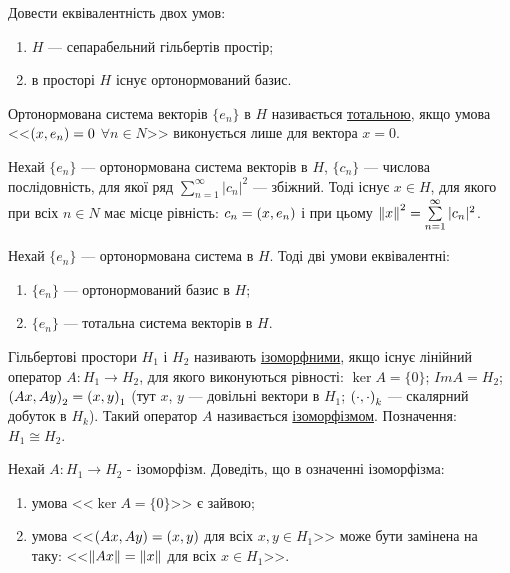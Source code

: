 \begin{exercise}
    Довести еквівалентність двох умов:
    \begin{enumerate}[label=\ukr*)]
        \item $H$ --- сепарабельний гільбертів простір;
        \item в просторі $H$ існує ортонормований базис.
    \end{enumerate}
\end{exercise}

\begin{theory}
    Ортонормована система векторів $\{e_n\}$ в $H$ називається \underline{тотальною}, 
    якщо умова <<$\left(x, e_n\right) = 0$ $\forall n \in N$>> виконується лише для вектора $x=0$.
\end{theory}

\begin{exercise}
    Нехай $\{e_n\}$ --- ортонормована система векторів в $H$, $\{c_n\}$ --- числова послідовність,
    для якої ряд $\sum\limits_{n=1}^\infty |c_n|^2$ --- збіжний. Тоді існує $x \in H$, 
    для якого при всіх $n \in N$ має місце рівність: $c_n = \left(x, e_n\right)$ і при цьому 
    $\left\lVert x\right\rVert^2 = \sum\limits_{n=1}^\infty |c_n|^2$.
\end{exercise}

\begin{exercise}
    Нехай $\{e_n\}$ --- ортонормована система в $H$. Тоді дві умови еквівалентні:
    \begin{enumerate}[label=\ukr*)]
        \item $\{e_n\}$ --- ортонормований базис в $H$;
        \item $\{e_n\}$ --- тотальна система векторів в $H$.
    \end{enumerate}
\end{exercise}

\begin{theory}
    Гільбертові простори $H_1$ і $H_2$ називають \underline{ізоморфними}, якщо існує 
    лінійний оператор $A: H_1 \rightarrow H_2$, для якого виконуються рівності: 
    $\ker A = \{0\}$; $ImA = H_2$; $\left(Ax, Ay\right)_2 = \left(x, y\right)_1$ (тут $x$, $y$ --- довільні 
    вектори в $H_1$; $\left(\cdot, \cdot\right)_k$ --- скалярний добуток в $H_k$). 
    Такий оператор $A$ називається \underline{ізоморфізмом}. Позначення: $H_1 \cong H_2 $.
\end{theory}

\begin{exercise}
    Нехай $A: H_1 \rightarrow H_2$ - ізоморфізм. Доведіть, що в означенні ізоморфізма:
    \begin{enumerate}[label=\ukr*)]
        \item умова <<$\ker A = \{0\}$>> є зайвою;
        \item умова <<$\left(Ax, Ay\right) = \left(x, y\right)$ для всіх $x, y \in H_1$>> може бути 
        замінена на таку: <<$\left\lVert Ax\right\rVert = \left\lVert x\right\rVert$ для всіх $x \in H_1$>>.
    \end{enumerate}
\end{exercise}
